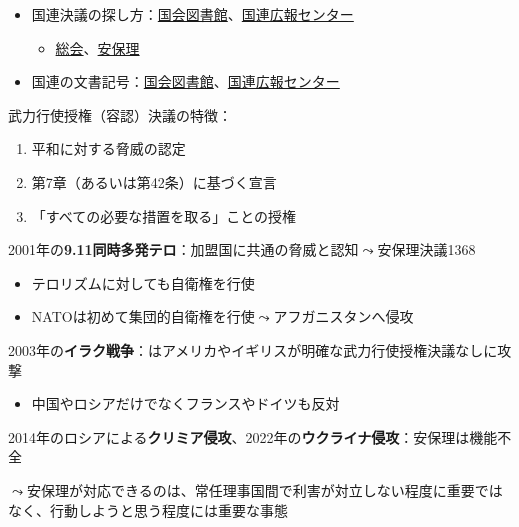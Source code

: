 \documentclass[
  xelatex,
  ja=standard]{bxjsarticle}
\providecommand{\tightlist}{%
  \setlength{\itemsep}{0pt}\setlength{\parskip}{0pt}}\usepackage{longtable,booktabs,array}
\begin{document}
\begin{itemize}
\tightlist
\item
  国連決議の探し方：\href{https://rnavi.ndl.go.jp/jp/politics/UN-tool.html}{国会図書館}、\href{https://www.unic.or.jp/texts_audiovisual/libraries/research_guide/}{国連広報センター}

  \begin{itemize}
  \tightlist
  \item
    \href{https://research.un.org/en/docs/ga/quick/regular/76}{総会}、\href{https://www.un.org/securitycouncil/content/resolutions-0}{安保理}
  \end{itemize}
\item
  国連の文書記号：\href{https://rnavi.ndl.go.jp/jp/politics/UN-docOR.html}{国会図書館}、\href{https://www.unic.or.jp/texts_audiovisual/libraries/research_guide/research/symbols/}{国連広報センター}
\end{itemize}

武力行使授権（容認）決議の特徴：

\begin{enumerate}
\def\labelenumi{\arabic{enumi}.}
\tightlist
\item
  平和に対する脅威の認定
\item
  第7章（あるいは第42条）に基づく宣言
\item
  「すべての必要な措置を取る」ことの授権
\end{enumerate}

2001年の\textbf{9.11同時多発テロ}：加盟国に共通の脅威と認知\(\leadsto\)安保理決議1368

\begin{itemize}
\tightlist
\item
  テロリズムに対しても自衛権を行使
\item
  NATOは初めて集団的自衛権を行使\(\leadsto\)アフガニスタンへ侵攻
\end{itemize}

2003年の\textbf{イラク戦争}：はアメリカやイギリスが明確な武力行使授権決議なしに攻撃

\begin{itemize}
\tightlist
\item
  中国やロシアだけでなくフランスやドイツも反対
\end{itemize}

2014年のロシアによる\textbf{クリミア侵攻}、2022年の\textbf{ウクライナ侵攻}：安保理は機能不全

\(\leadsto\)安保理が対応できるのは、常任理事国間で利害が対立しない程度に重要ではなく、行動しようと思う程度には重要な事態
\end{document}
